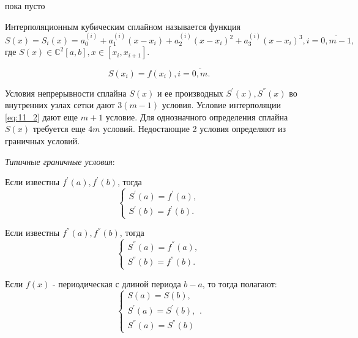 \begin{col-answer-preambule}
	\begin{plan}
    \item пока пусто
	\end{plan}
\end{col-answer-preambule}


Интерполяционным кубическим сплайном называется функция
\begin{equation*}
  S(x) = S_i (x) = a_0^{(i)} + a_1^{(i)}(x - x_i) + a_2^{(i)}(x-x_i)^2 + a_3^{(i)} (x - x_i)^3, i = \overline{0, m - 1},
\end{equation*}
где $S(x) \in \mathbb{C}^{2} [a, b], x \in [x_i, x_{i + 1}]$.

\begin{equation}\label{eq:11_2}
  S(x_i) = f(x_i), i = \overline{0, m}.
\end{equation}

Условия непрерывности сплайна $S(x)$ и ее производных $S^{'}(x), S^{''}(x)$ во внутренних узлах сетки дают $3 (m - 1)$ условия. Условие интерполяции \eqref{eq:11_2} дают еще $m + 1$ условие. Для однозначного определения сплайна $S(x)$ требуется еще $4m$ условий. Недостающие 2 условия определяют из граничных условий.

\textit{Типичные граничные условия}:

Если известны $f^{'}(a), f^{'}(b)$, тогда
\begin{equation*}
  \begin{cases} S^{'}(a) = f^{'}(a), \\ S^{'}(b) = f^{'}(b). \end{cases}
\end{equation*}

Если известны $f^{''}(a), f^{''}(b)$, тогда
\begin{equation*}
  \begin{cases} S^{''}(a) = f^{''}(a), \\ S^{''}(b) = f^{''}(b). \end{cases}
\end{equation*}

Если $f(x)$ - периодическая с длиной периода $b - a$, то тогда полагают:
\begin{equation*}
  \begin{cases} S(a) = S(b), \\ S^{'} (a) = S^{'} (b), \\  S^{''} (a) = S^{''} (b) \end{cases}.
\end{equation*}

